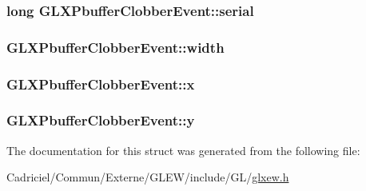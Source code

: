 \hypertarget{struct_g_l_x_pbuffer_clobber_event_a6390b2875ae06a4cb827d2b4c321eda3}{
\subsubsection[{serial}]{ {\bf long} G\-L\-X\-Pbuffer\-Clobber\-Event\-::serial}}\label{struct_g_l_x_pbuffer_clobber_event_a6390b2875ae06a4cb827d2b4c321eda3}
\hypertarget{struct_g_l_x_pbuffer_clobber_event_aaca375fecb872c73c60cd5d0bfc7c7a5}{
\subsubsection[{width}]{ G\-L\-X\-Pbuffer\-Clobber\-Event\-::width}}\label{struct_g_l_x_pbuffer_clobber_event_aaca375fecb872c73c60cd5d0bfc7c7a5}
\hypertarget{struct_g_l_x_pbuffer_clobber_event_a8f0a7162a033c89ee94ce535580dbc32}{
\subsubsection[{x}]{ G\-L\-X\-Pbuffer\-Clobber\-Event\-::x}}\label{struct_g_l_x_pbuffer_clobber_event_a8f0a7162a033c89ee94ce535580dbc32}
\hypertarget{struct_g_l_x_pbuffer_clobber_event_a69eb7ac60d36ac3ec4550ac206cfc61f}{
\subsubsection[{y}]{ G\-L\-X\-Pbuffer\-Clobber\-Event\-::y}}\label{struct_g_l_x_pbuffer_clobber_event_a69eb7ac60d36ac3ec4550ac206cfc61f}


The documentation for this struct was generated from the following file\-:\begin{DoxyCompactItemize}
\item 
Cadriciel/\-Commun/\-Externe/\-G\-L\-E\-W/include/\-G\-L/\hyperlink{glxew_8h}{glxew.\-h}\end{DoxyCompactItemize}
